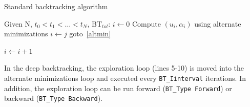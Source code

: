 \documentclass[10pt,oneside]{report}
\begin{document}
\begin{algorithm}
	\caption{Standard backtracking algorithm}
	\label{algo:StdBT}
		\begin{algorithmic}[1]
			\State Given N, $t_0 < t_1 < \dots < t_N$, $\mathrm{BT}_{tol}$:
			\State $i \leftarrow 0$
			\Repeat
				\State Compute $(u_i,\alpha_i)$ using alternate minimizations\label{altmin}
						\State $i \leftarrow j$
						\State goto~\ref{altmin}
					\EndIf	
				\EndFor
				
			\State $i \leftarrow i+1$
		\end{algorithmic}
\end{algorithm}

In the deep backtracking, the exploration loop (lines 5-10) is moved into the alternate minimizations loop and executed every \verb+BT_Iinterval+ iterations. In addition, the exploration loop can be run forward (\verb+BT_Type Forward+) or backward (\verb+BT_Type Backward+).
\end{document}

